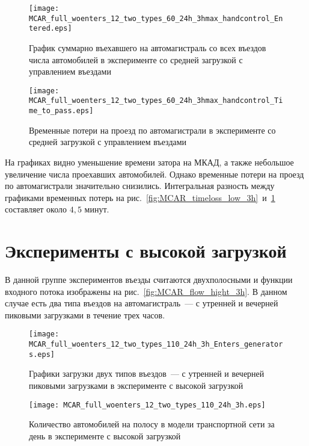 \begin{figure}[ht]
    \begin{minipage}[b][][b]{0.49\textwidth}
        \centering
        \texttt{[image: MCAR\_full\_woenters\_12\_two\_types\_60\_24h\_3hmax\_handcontrol\_Entered.eps]}
        \caption{График суммарно въехавшего на автомагистраль со всех въездов числа автомобилей в эксперименте со средней загрузкой с управлением въездами}
        \label{fig:MCAR_entered_low_3h_handcontrol}
    \end{minipage}
    \hfill
    \begin{minipage}[b][][b]{0.49\textwidth}
        \centering
        \texttt{[image: MCAR\_full\_woenters\_12\_two\_types\_60\_24h\_3hmax\_handcontrol\_Time\_to\_pass.eps]}
        \caption{Временные потери на проезд по автомагистрали в эксперименте со средней загрузкой с управлением въездами}
        \label{fig:MCAR_timeloss_low_3h_handcontrol}
    \end{minipage}
\end{figure}

На графиках видно уменьшение времени затора на МКАД, а также небольшое увеличение числа проехавших автомобилей.
Однако временные потери на проезд по автомагистрали значительно снизились.
Интегральная разность между графиками временных потерь на рис.~\ref{fig:MCAR_timeloss_low_3h}~и~\ref{fig:MCAR_timeloss_low_3h_handcontrol} составляет около $4,5$ минут.


\section{Эксперименты с высокой загрузкой}
В данной группе экспериментов въезды считаются двухполосными и функции входного потока изображены на рис.~\ref{fig:MCAR_flow_hight_3h}.
В данном случае есть два типа въездов на автомагистраль~--- с утренней и вечерней пиковыми загрузками в течение трех часов.
\begin{figure}[ht]
    \begin{minipage}[b][][b]{0.49\textwidth}
        \centering
        \texttt{[image: MCAR\_full\_woenters\_12\_two\_types\_110\_24h\_3h\_Enters\_generators.eps]}
        \caption{Графики загрузки двух типов въездов~--- с утренней и вечерней пиковыми загрузками в эксперименте с высокой загрузкой}
        \label{fig:MCAR_flow_hight_3h}
    \end{minipage}
    \hfill
    \begin{minipage}[b][][b]{0.49\textwidth}
        \centering
        \texttt{[image: MCAR\_full\_woenters\_12\_two\_types\_110\_24h\_3h.eps]}
        \caption{Количество автомобилей на полосу в модели транспортной сети за день в эксперименте с высокой загрузкой}
        \label{fig:MCAR_heatmap_hight_3h}
    \end{minipage}
\end{figure}


